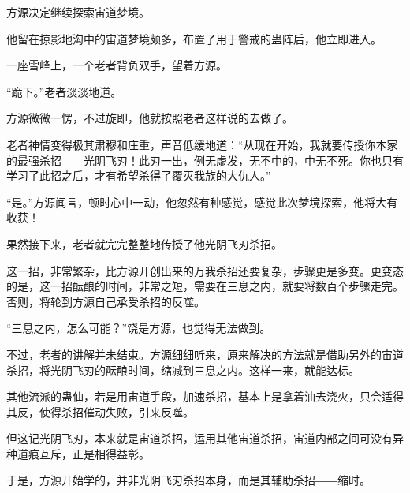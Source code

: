 \begin{this_body}
方源决定继续探索宙道梦境。

他留在掠影地沟中的宙道梦境颇多，布置了用于警戒的蛊阵后，他立即进入。

一座雪峰上，一个老者背负双手，望着方源。

“跪下。”老者淡淡地道。

方源微微一愣，不过旋即，他就按照老者这样说的去做了。

老者神情变得极其肃穆和庄重，声音低缓地道：“从现在开始，我就要传授你本家的最强杀招――光阴飞刃！此刃一出，例无虚发，无不中的，中无不死。你也只有学习了此招之后，才有希望杀得了覆灭我族的大仇人。”

“是。”方源闻言，顿时心中一动，他忽然有种感觉，感觉此次梦境探索，他将大有收获！

果然接下来，老者就完完整整地传授了他光阴飞刃杀招。

这一招，非常繁杂，比方源开创出来的万我杀招还要复杂，步骤更是多变。更变态的是，这一招酝酿的时间，非常之短，需要在三息之内，就要将数百个步骤走完。否则，将轮到方源自己承受杀招的反噬。

“三息之内，怎么可能？”饶是方源，也觉得无法做到。

不过，老者的讲解并未结束。方源细细听来，原来解决的方法就是借助另外的宙道杀招，将光阴飞刃的酝酿时间，缩减到三息之内。这样一来，就能达标。

其他流派的蛊仙，若是用宙道手段，加速杀招，基本上是拿着油去浇火，只会适得其反，使得杀招催动失败，引来反噬。

但这记光阴飞刃，本来就是宙道杀招，运用其他宙道杀招，宙道内部之间可没有异种道痕互斥，正是相得益彰。

于是，方源开始学的，并非光阴飞刃杀招本身，而是其辅助杀招――缩时。

\end{this_body}

